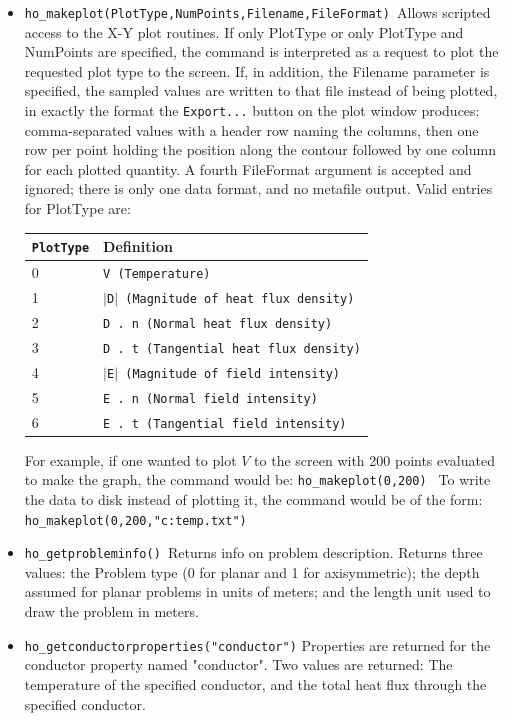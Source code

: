 \begin{itemize}
Example: To catch all values at (0.01,0) use

\texttt{T,Fx,Fy,Gx,Gy,kx,ky= ho\_getpointvalues(0.01,0) }

\item \texttt{ho\_makeplot(PlotType,NumPoints,Filename,FileFormat) }Allows scripted access
to the X-Y plot routines. If only PlotType or only PlotType and NumPoints
are specified, the command is interpreted as a request to plot the requested
plot type to the screen. If, in addition, the Filename parameter is
specified, the sampled values are written to that file instead of being
plotted, in exactly the format the \texttt{Export...} button on the plot
window produces: comma-separated values with a header row naming the columns,
then one row per point holding the position along the contour followed by one
column for each plotted quantity. A fourth FileFormat argument is accepted and
ignored; there is only one data format, and no metafile output. Valid entries
for PlotType are:

\begin{tabular}{ll}
\texttt{PlotType} &  Definition \\ \hline
 0 & \texttt{V (Temperature)} \\
 1 & \texttt{$\vert$D$\vert$ (Magnitude of heat flux density)} \\
 2 & \texttt{D . n (Normal heat flux density)} \\
 3 & \texttt{D . t (Tangential heat flux density)} \\
 4 & \texttt{$\vert$E$\vert$ (Magnitude of field intensity)} \\
 5 & \texttt{E . n (Normal field intensity)} \\
 6 & \texttt{E . t (Tangential field intensity)}
\end{tabular}


For example, if one wanted to plot $V $ to the screen with 200 points evaluated
to make the graph, the command would be: \newline
\texttt{ho\_makeplot(0,200) } \newline
To write the data to disk instead of plotting it, the command would be of
the form:\texttt{ } \newline
\texttt{ho\_makeplot(0,200,"c:temp.txt")} \newline


\item \texttt{ho\_getprobleminfo() }Returns info on problem description. Returns three
values: the Problem type (0 for planar and 1 for axisymmetric); the depth
assumed for planar problems in units of meters; and the length unit used to draw the
problem in meters.

\item \texttt{ho\_getconductorproperties("conductor")} Properties are returned for the
conductor property named "conductor". Two values are returned: The temperature
of the specified conductor, and the total heat flux through the specified
conductor.
\end{itemize}

